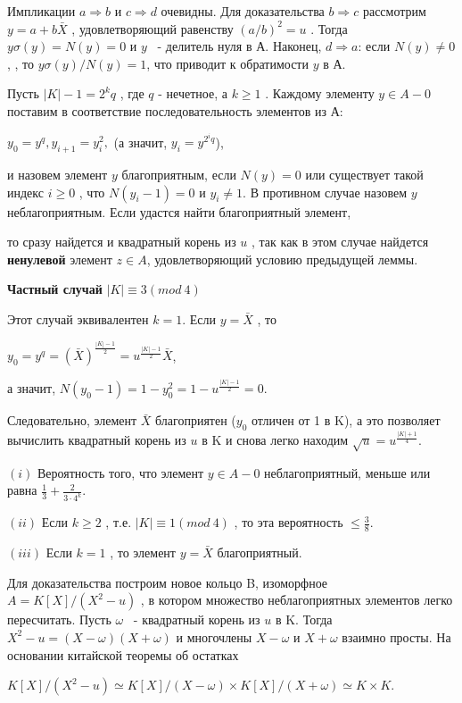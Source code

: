 \begin{myproof}
Импликации $a \Rightarrow b$
 и $c \Rightarrow d$
 очевидны. Для доказательства $b \Rightarrow c$
 рассмотрим $y = a + b \bar X$
 , удовлетворяющий равенству $(a/b)^2 = u$
. Тогда $y\sigma(y) = N(y) = 0$
 и $y$
 ~- делитель нуля в А. Наконец, $d \Rightarrow a$:
 если $N(y) \not= 0$,
 , то $y\sigma(y)/N(y) = 1$, что приводит к обратимости $y$
 в А.
\end{myproof}
Пусть $|K| - 1 = 2^kq$
, где $q$ - нечетное, а $k \geqslant 1$
. Каждому элементу $y \in A - {0}$
 поставим в соответствие последовательность элементов из А:

\begin{center}
$y_0 = y^q, y_{i+1} = y_i^2,$ (а значит, $y_i = y^{2^iq}$),
\end{center}


и назовем элемент $y$
 благоприятным, если $N(y) = 0$
 или существует такой индекс $i\geqslant 0$
 , что $N(y_i-1) = 0$
 и $y_i \not= 1$. В противном случае назовем $y$
 неблагоприятным. Если удастся найти благоприятный элемент,

\newpage

то сразу найдется и квадратный корень из $u$
, так как в этом случае найдется {\bf ненулевой} элемент $z \in A$, удовлетворяющий условию предыдущей леммы.

{\bf Частный случай} $|K| \equiv 3 (mod \ 4)$

Этот случай эквивалентен $k = 1$. Если $y = \bar X$
, то

\begin{center}
$y_0 = y^q = (\bar X)^{\frac{|K|-1}{2}} = u^{\frac{|K|-1}{2}}\bar X$,

а значит, $N(y_0 -1) = 1 - y^2_0 = 1 - u^{\frac{|K|-1}{2}} = 0$.
\end{center}

Следовательно, элемент $\bar X$
 благоприятен ($y_0$
 отличен от 1 в K), а это позволяет вычислить квадратный корень из $u$
 в K и снова легко находим $\sqrt u = u^{\frac{|K|+1}{4}}$.

\begin{predl}

$(i)$ Вероятность того, что элемент $y \in A - {0}$
 неблагоприятный, меньше или равна $\frac 13 + \frac{2}{3\cdot 4^k}$.

$(ii)$ Если $k\geqslant 2$
 , т.е. $|K| \equiv 1 (mod \ 4)$
, то эта вероятность $\leqslant \frac 38$.

$(iii)$ Если $k = 1$
 , то элемент $y = \bar X$
 благоприятный.

Для доказательства построим новое кольцо B, изоморфное $A = K[X]/(X^2 - u)$
, в котором множество неблагоприятных элементов легко пересчитать. Пусть $\omega$
 ~- квадратный корень из $u$
 в K. Тогда $X^2 - u = (X-\omega)(X+\omega)$
 и многочлены $X - \omega$
 и $X + \omega$
 взаимно просты. На основании китайской теоремы об остатках
\end{predl}
\begin{center}
$K[X]/(X^2 - u) \simeq K[X]/(X-\omega) \times K[X]/(X+\omega) \simeq K \times K$.
\end{center}


